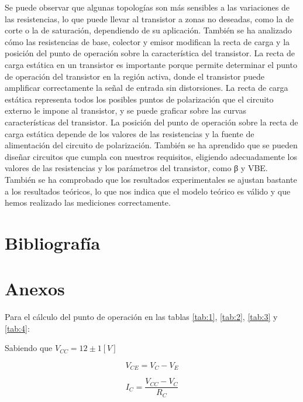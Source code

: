 \documentclass[10pt, a4paper]{article}
\begin{document}
    Se puede observar que algunas topologías son más sensibles a las variaciones de las resistencias, lo que puede llevar al transistor a zonas no deseadas, como la de corte o la de saturación, dependiendo de su aplicación. También se ha analizado cómo las resistencias de base, colector y emisor modifican la recta de carga y la posición del punto de operación sobre la característica del transistor. La recta de carga estática en un transistor es importante porque permite determinar el punto de operación del transistor en la región activa, donde el transistor puede amplificar correctamente la señal de entrada sin distorsiones. La recta de carga estática representa todos los posibles puntos de polarización que el circuito externo le impone al transistor, y se puede graficar sobre las curvas características del transistor. La posición del punto de operación sobre la recta de carga estática depende de los valores de las resistencias y la fuente de alimentación del circuito de polarización. También se ha aprendido que se pueden diseñar circuitos que cumpla con nuestros requisitos, eligiendo adecuadamente los valores de las resistencias y los parámetros del transistor, como β y VBE. También se ha comprobado que los resultados experimentales se ajustan bastante a los resultados teóricos, lo que nos indica que el modelo teórico es válido y que hemos realizado las mediciones correctamente.

    \newpage

    \section{Bibliografía}

    \printbibliography

    \newpage

    \section{Anexos}

    Para el cálculo del punto de operación en las tablas \ref{tab:1}, \ref{tab:2}, \ref{tab:3} y \ref{tab:4}:

    Sabiendo que $V_{CC} = 12 \pm 1 [V]$

    \setcounter{equation}{1}
    \begin{equation}
        V_{CE} = V_C - V_E
        \label{Qeq1}
    \end{equation}

    \setcounter{equation}{1}
    \begin{equation}
        I_C = \frac{V_{CC} - V_C}{R_C}
        \label{Qeq2}
    \end{equation}
\end{document}
